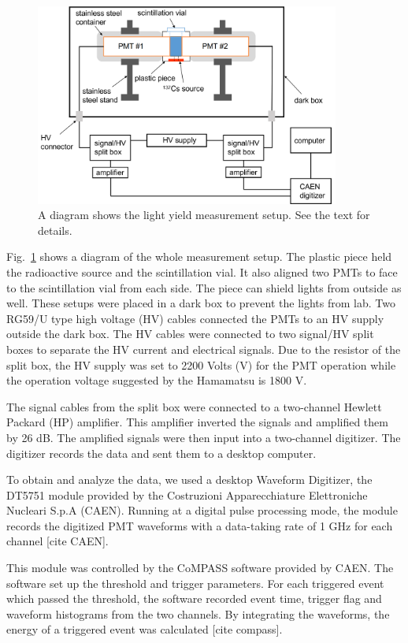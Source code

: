 \begin{figure}[htbp]
	\centering	
	\includegraphics[width=10cm]{teLSsetup.png}
	\caption{A diagram shows the light yield measurement setup. See the text for details.}
	\label{teLSsetup}
\end{figure}

Fig.~\ref{teLSsetup} shows a diagram of the whole measurement setup. The plastic piece held the radioactive source and the scintillation vial. It also aligned two PMTs to face to the scintillation vial from each side. The piece can shield lights from outside as well. These setups were placed in a dark box to prevent the lights from lab. Two RG59/U type high voltage (HV) cables connected the PMTs to an HV supply outside the dark box. The HV cables were connected to two signal/HV split boxes to separate the HV current and electrical signals. Due to the resistor of the split box, the HV supply was set to 2200 Volts (V) for the PMT operation while the operation voltage suggested by the Hamamatsu is 1800 V. 

The signal cables from the split box were connected to a two-channel Hewlett Packard (HP) amplifier. This amplifier inverted the signals and amplified them by 26 dB. The amplified signals were then input into a two-channel digitizer. The digitizer records the data and sent them to a desktop computer.

To obtain and analyze the data, we used a desktop Waveform Digitizer, the DT5751 module provided by the Costruzioni Apparecchiature Elettroniche Nucleari S.p.A (CAEN). Running at a digital pulse processing mode, the module records the digitized PMT waveforms with a data-taking rate of 1 GHz for each channel [cite CAEN].

This module was controlled by the CoMPASS software provided by CAEN. The software set up the threshold and trigger parameters. For each triggered event which passed the threshold, the software recorded event time, trigger flag and waveform histograms from the two channels. By integrating the waveforms, the energy of a triggered event was calculated [cite compass].

